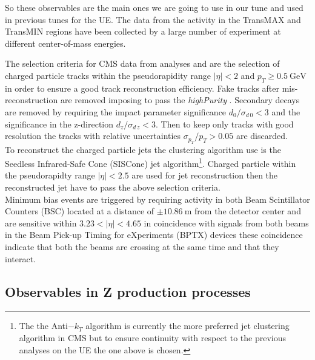 So these observables are the main ones we are going to use in our tune and used in previous tunes for the UE. The data from the activity in the TransMAX and TransMIN  regions have been collected by  a large number of experiment at different center-of-mass energies. 

The selection criteria for CMS data from analyses \cite{CMS-PAS-FSQ-15-007} and \cite{CMS-PAS-FSQ-12-020} are the selection of charged particle tracks within the pseudorapidity range $|\eta| < 2$ and $p_T \geq 0.5\ \mathrm{GeV}$ in order to ensure a good track reconstruction efficiency. Fake tracks after mis-reconstruction are removed imposing to pass the \textit{highPurity} \cite{HighPurity}. Secondary decays are removed by requiring the impact parameter significance $d_0/\sigma_{d\,0} < 3$ and the significance in the z-direction $d_z/\sigma_{d\,z} < 3$. Then to keep only tracks with good resolution the tracks with relative uncertainties $\sigma_{p_T}/p_T > 0.05$ are discarded.
\\
To reconstruct the charged particle jets the clustering algorithm use is the Seedless Infrared-Safe Cone (SISCone) \cite{JetAlgorithm1} jet algorithm\footnote{The the Anti$-k_T$ algorithm \cite{JetAlgorithm2} is currently the more preferred jet clustering algorithm in CMS but to ensure continuity with respect to the previous analyses on the UE the one above is chosen.}. Charged particle within the pseudorapidty range $|\eta|<2.5$ are used for jet reconstruction then the reconstructed jet have to pass the above selection criteria.
\\
Minimum bias events are triggered by requiring activity in both Beam Scintillator Counters (BSC) located at a distance of $\pm10.86\ \mathrm{m}$ from the detector center and are sensitive within $3.23 < |\eta| < 4.65$ in coincidence with signals from both beams in the Beam Pick-up Timing for eXperiments (BPTX) devices these coincidence indicate that both the beams are crossing at the same time and that they interact.
 

\subsection{Observables in Z production processes}

